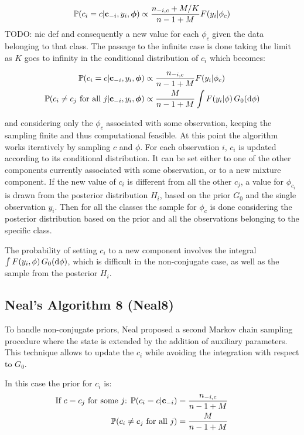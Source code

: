 \begin{align}
			\mathbb P(c_{i}=c | \mathbf c_{-i}, y_{i},\boldsymbol\phi) \propto \frac{n_{-i,c} + M/{K}}{n-1+M} F(y_{i}| \phi_{c}) 
\end{align}
TODO: nic def
and consequently a new value for each $\phi_c$ given the data belonging to that class. The passage to the infinite case is done taking the limit as $K$ goes to infinity in the conditional distribution of $c_i$ which becomes:


\begin{align}
			\mathbb P(c_{i}=c | \mathbf c_{-i}, y_{i},\boldsymbol\phi) &\propto \frac{n_{-i,c} }{n-1+M} F(y_{i}| \phi_{c}) \\
			\mathbb P(c_{i}\neq c_{j} \text{ for all } j | \mathbf c_{-i}, y_{i},\boldsymbol\phi) &\propto \frac{M }{n-1+M} \int F(y_{i}| \phi) \, G_0(\mathrm d\phi)
\end{align}

and considering only the $\phi_c$ associated with some observation, keeping the sampling finite and thus computational feasible. At this point the algorithm works iteratively by sampling $c$ and $\phi$. For each observation $i$, $c_i$ is updated according to its conditional distribution. It can be set either to one of the other components currently associated with some observation, or to a new mixture component.  If the new value of $c_i$ is different from all the other $c_j$, a value for $\phi_{c_i}$ is drawn from the posterior distribution $H_i$, based on the prior $G_0$ and the single observation $y_i$. Then for all the classes the  sample for $\phi_c$ is done considering the posterior distribution based on the prior and all the observations belonging to the specific class.

The probability of setting $c_i$ to a new component involves the integral $\int F(y_{i},\phi) \, G_0(\mathrm d\phi)$, which is difficult in the non-conjugate case, as well as the sample from the posterior $H_i$.

\subsection{Neal's Algorithm 8 (Neal8)}
To handle non-conjugate priors, Neal proposed a second Markov chain sampling procedure where the state is extended by the addition of auxiliary parameters.
This technique allows to update the $c_i$ while avoiding the integration with respect to $G_0$.
 
In this case the prior for $c_i$ is:
\begin{align}
            \hspace{-25pt}
            \vspace{-12pt}
                \text{If $c=c_j$ for some $j$: } \PP(c_i=c | \mathbf c_{-i}) &= \frac{n_{-i,c}}{n-1+M}  \\
                \PP(c_{i}\neq c_{j} \text{ for all } j) &=\frac{M }{n-1+M}                  
\end{align}
            
